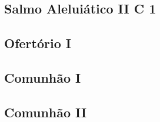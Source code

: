 \AllowPageFlush

\subsection[Salmo Aleluiático II]{Salmo Aleluiático II \textmd{C 1}}\label{subsection:communia/commune-sanctorum/psalmus-alleluiaticus-2}

\AllowPageFlush

\subsection{Ofertório I}\label{subsection:communia/commune-sanctorum/offertorium-1}

\AllowPageFlush

\label{subsection:communia/commune-sanctorum/offertorium-2}

\AllowPageBreak

\subsection{Comunhão I}\label{subsection:communia/commune-sanctorum/communio-1}

\AllowPageFlush

\subsection{Comunhão II}\label{subsection:communia/commune-sanctorum/communio-2}

